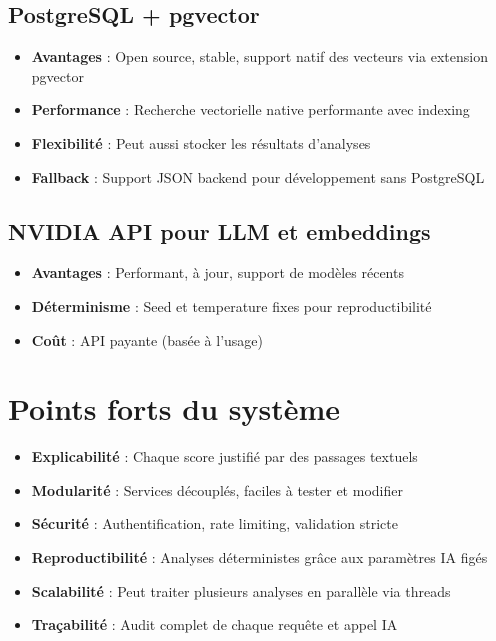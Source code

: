 \documentclass[12pt,a4paper,oneside]{book}
\begin{document}
\subsection{PostgreSQL + pgvector}

\begin{itemize}
    \item \textbf{Avantages} : Open source, stable, support natif des vecteurs via extension pgvector
    \item \textbf{Performance} : Recherche vectorielle native performante avec indexing
    \item \textbf{Flexibilité} : Peut aussi stocker les résultats d'analyses
    \item \textbf{Fallback} : Support JSON backend pour développement sans PostgreSQL
\end{itemize}

\subsection{NVIDIA API pour LLM et embeddings}

\begin{itemize}
    \item \textbf{Avantages} : Performant, à jour, support de modèles récents
    \item \textbf{Déterminisme} : Seed et temperature fixes pour reproductibilité
    \item \textbf{Coût} : API payante (basée à l'usage)
\end{itemize}

\section{Points forts du système}

\begin{itemize}
    \item \textbf{Explicabilité} : Chaque score justifié par des passages textuels
    \item \textbf{Modularité} : Services découplés, faciles à tester et modifier
    \item \textbf{Sécurité} : Authentification, rate limiting, validation stricte
    \item \textbf{Reproductibilité} : Analyses déterministes grâce aux paramètres IA figés
    \item \textbf{Scalabilité} : Peut traiter plusieurs analyses en parallèle via threads
    \item \textbf{Traçabilité} : Audit complet de chaque requête et appel IA
\end{itemize}
\end{document}
